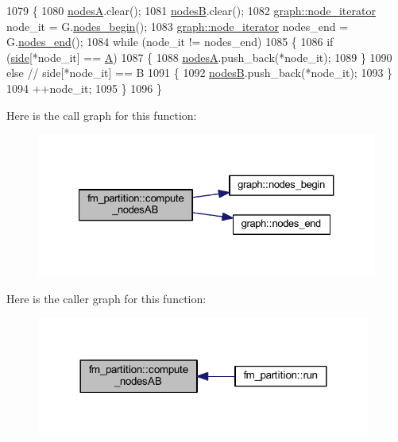 \begin{DoxyCode}
1079 \{
1080     \mbox{\hyperlink{classfm__partition_acdcb82ae253e8eaf75a7efca3ca2b377}{nodesA}}.clear();
1081     \mbox{\hyperlink{classfm__partition_a3616b858b66682c528365a4803a4efad}{nodesB}}.clear();
1082     \mbox{\hyperlink{classgraph_a2cb374b84c133ce13f94e73c3e5da7fa}{graph::node\_iterator}} node\_it = G.\mbox{\hyperlink{classgraph_aec053a4b509d1be804237a80044c54c0}{nodes\_begin}}();
1083     \mbox{\hyperlink{classgraph_a2cb374b84c133ce13f94e73c3e5da7fa}{graph::node\_iterator}} nodes\_end = G.\mbox{\hyperlink{classgraph_abbf9c0cb5629e98e1142254911238173}{nodes\_end}}();
1084     \textcolor{keywordflow}{while} (node\_it != nodes\_end)
1085     \{
1086     \textcolor{keywordflow}{if} (\mbox{\hyperlink{classfm__partition_af83309e781e9658fc0ff923ced087bfc}{side}}[*node\_it] == \mbox{\hyperlink{classfm__partition_a738e75c601403754e61e6dac623fd3ab}{A}})
1087     \{
1088         \mbox{\hyperlink{classfm__partition_acdcb82ae253e8eaf75a7efca3ca2b377}{nodesA}}.push\_back(*node\_it);
1089     \}
1090     \textcolor{keywordflow}{else}    \textcolor{comment}{// side[*node\_it] == B}
1091     \{
1092         \mbox{\hyperlink{classfm__partition_a3616b858b66682c528365a4803a4efad}{nodesB}}.push\_back(*node\_it);
1093     \}
1094     ++node\_it;
1095     \}
1096 \}
\end{DoxyCode}
Here is the call graph for this function\+:\nopagebreak
\begin{figure}[H]
\begin{center}
\leavevmode
\includegraphics[width=327pt]{classfm__partition_aaa8f24af3be860bfa42a171c25420c2c_cgraph}
\end{center}
\end{figure}
Here is the caller graph for this function\+:\nopagebreak
\begin{figure}[H]
\begin{center}
\leavevmode
\includegraphics[width=312pt]{classfm__partition_aaa8f24af3be860bfa42a171c25420c2c_icgraph}
\end{center}
\end{figure}
